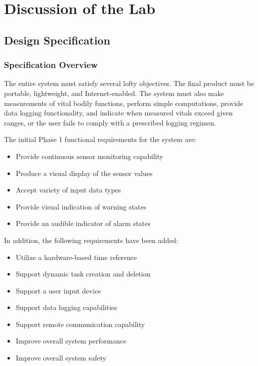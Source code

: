 \documentclass[12pt]{article} %
\begin{document}
\section{Discussion of the Lab}

\subsection{Design Specification\label{sec:designSpec}} 

\subsubsection{Specification Overview}
The entire system must satisfy several lofty objectives. The final product must
be portable, lightweight, and Internet-enabled. The system must also make
measurements of vital bodily functions, perform simple computations, provide
data logging functionality, and indicate when measured vitals exceed given
ranges, or the user fails to comply with a prescribed logging regimen. \\

\begin{itemize}[$$]
  \item The initial Phase 1 functional requirements for the system are:
    \begin{itemize}[$\bullet$]
      \item Provide continuous sensor monitoring capability
      \item Produce a visual display of the sensor values
      \item Accept variety of input data types
      \item Provide visual indication of warning states
      \item Provide an audible indicator of alarm states
    \end{itemize}
  \item In addition, the following requirements have been added:
    \begin{itemize}[$\bullet$]
      \item Utilize a hardware-based time reference
      \item Support dynamic task creation and deletion
      \item Support a user input device
      \item Support data logging capabilities
      \item Support remote communication capability
      \item Improve overall system performance
      \item Improve overall system safety
    \end{itemize}
\end{itemize}
\end{document}
